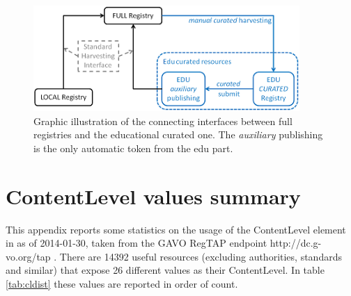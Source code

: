 \documentclass{ivoa}
\begin{document}
\begin{figure}

\includegraphics[width=0.9\textwidth]{curation.png}
\caption{Graphic illustration
    of the connecting interfaces between full registries and the educational
    curated one. The 
\emph{auxiliary}
 publishing is the only automatic token
    from the edu part.}
\label{fig:curation}
\end{figure}


\appendix

\section{ContentLevel values summary}

\label{app:clcurrval}


This appendix reports some statistics on the usage of the ContentLevel 
element in \citep{2008ivoa.spec.0222P} as of 2014-01-30, taken from the
GAVO RegTAP endpoint http://dc.g-vo.org/tap .
There are 14392 useful resources (excluding authorities, standards and
similar) that expose 26 different values as their ContentLevel.
In table \ref{tab:cldist} these values are reported in order of count.
\end{document}
